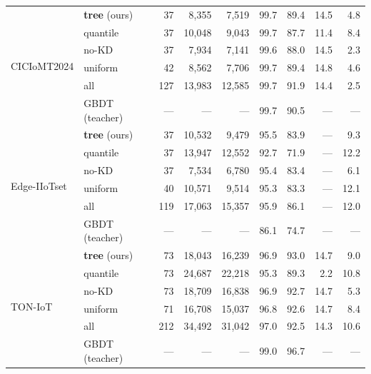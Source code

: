 \begin{table}[!ht]
{\begin{tabular}{l l r r r r r r r}
\midrule
\multirow{6}{*}{CICIoMT2024}
& \textbf{tree} (ours) & 37 & 8,355 & 7,519 & 99.7 & 89.4 & 14.5 & 4.8 \\
& quantile & 37 & 10,048 & 9,043 & 99.7 & 87.7 & 11.4 & 8.4 \\
& no-KD & 37 & 7,934 & 7,141 & 99.6 & 88.0 & 14.5 & 2.3 \\
& uniform & 42 & 8,562 & 7,706 & 99.7 & 89.4 & 14.8 & 4.6 \\
& all & 127 & 13,983 & 12,585 & 99.7 & 91.9 & 14.4 & 2.5 \\
& GBDT (teacher) & --- & --- & --- & 99.7 & 90.5 & --- & --- \\
\midrule
\multirow{6}{*}{Edge-IIoTset}
& \textbf{tree} (ours) & 37 & 10,532 & 9,479 & 95.5 & 83.9 & --- & 9.3 \\
& quantile & 37 & 13,947 & 12,552 & 92.7 & 71.9 & --- & 12.2 \\
& no-KD & 37 & 7,534 & 6,780 & 95.4 & 83.4 & --- & 6.1 \\
& uniform & 40 & 10,571 & 9,514 & 95.3 & 83.3 & --- & 12.1 \\
& all & 119 & 17,063 & 15,357 & 95.9 & 86.1 & --- & 12.0 \\
& GBDT (teacher) & --- & --- & --- & 86.1 & 74.7 & --- & --- \\
\midrule
\multirow{6}{*}{TON-IoT}
& \textbf{tree} (ours) & 73 & 18,043 & 16,239 & 96.9 & 93.0 & 14.7 & 9.0 \\
& quantile & 73 & 24,687 & 22,218 & 95.3 & 89.3 & 2.2 & 10.8 \\
& no-KD & 73 & 18,709 & 16,838 & 96.9 & 92.7 & 14.7 & 5.3 \\
& uniform & 71 & 16,708 & 15,037 & 96.8 & 92.6 & 14.7 & 8.4 \\
& all & 212 & 34,492 & 31,042 & 97.0 & 92.5 & 14.3 & 10.6 \\
& GBDT (teacher) & --- & --- & --- & 99.0 & 96.7 & --- & --- \\
\bottomrule
\end{tabular}}
\end{table}
